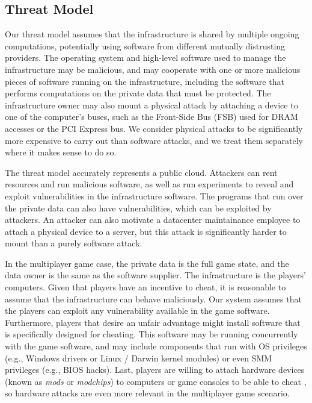 \subsection{Threat Model}
\label{sec:threat}

Our threat model assumes that the infrastructure is shared by multiple ongoing
computations, potentially using software from different mutually distrusting
providers. The operating system and high-level software used to manage the
infrastructure may be malicious, and may cooperate with one or more malicious
pieces of software running on the infrastructure, including the software that
performs computations on the private data that must be protected. The
infrastructure owner may also mount a physical attack by attaching a device to
one of the computer's buses, such as the Front-Side Bus (FSB) used for DRAM
accesses or the PCI Express bus. We consider physical attacks to be
significantly more expensive to carry out than software attacks, and we treat
them separately where it makes sense to do so.

The threat model accurately represents a public cloud. Attackers can rent
resources and run malicious software, as well as run experiments to reveal and
exploit vulnerabilities in the infrastructure software. The programs that run
over the private data can also have vulnerabilities, which can be exploited by
attackers. An attacker can also motivate a datacenter maintainance employee to
attach a physical device to a server, but this attack is significantly harder
to mount than a purely software attack.

In the multiplayer game case, the private data is the full game state, and the
data owner is the same as the software supplier. The infrastructure is the
players' computers. Given that players have an incentive to cheat, it is
reasonable to assume that the infrastructure can behave maliciously. Our system
assumes that the players can exploit any vulnerability available in the game
software. Furthermore, players that desire an unfair advantage might install
software that is specifically designed for cheating. This software may be
running concurrently with the game software, and may include components that
run with OS privileges (e.g., Windows drivers or Linux / Darwin kernel
modules) or even SMM privileges (e.g., BIOS hacks). Last, players are willing
to attach hardware devices (known as \textit{mods} or \textit{modchips}) to
computers or game consoles to be able to cheat \cite{harris2007mod}, so
hardware attacks are even more relevant in the multiplayer game scenario.

